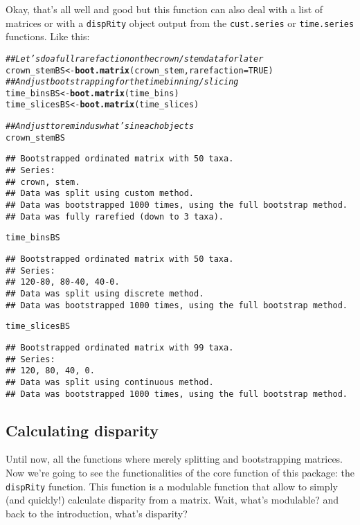 \documentclass{article}\usepackage[]{graphicx}\usepackage[]{color}
\makeatletter
\newcommand{\hlnum}[1]{\textcolor[rgb]{0.686,0.059,0.569}{#1}}%
\newcommand{\hlcom}[1]{\textcolor[rgb]{0.678,0.584,0.686}{\textit{#1}}}%
\newcommand{\hlstd}[1]{\textcolor[rgb]{0.345,0.345,0.345}{#1}}%
\newcommand{\hlkwb}[1]{\textcolor[rgb]{0.69,0.353,0.396}{#1}}%
\newcommand{\hlkwc}[1]{\textcolor[rgb]{0.333,0.667,0.333}{#1}}%
\newcommand{\hlkwd}[1]{\textcolor[rgb]{0.737,0.353,0.396}{\textbf{#1}}}%
\newenvironment{kframe}{%
 \def\at@end@of@kframe{}%
 \ifinner\ifhmode%
  \def\at@end@of@kframe{\end{minipage}}%
  \begin{minipage}{\columnwidth}%
 \fi\fi%
 \def\FrameCommand##1{\hskip\@totalleftmargin \hskip-\fboxsep
 \colorbox{shadecolor}{##1}\hskip-\fboxsep
     \hskip-\linewidth \hskip-\@totalleftmargin \hskip\columnwidth}%
 \MakeFramed {\advance\hsize-\width
   \@totalleftmargin\z@ \linewidth\hsize
   \@setminipage}}%
 {\par\unskip\endMakeFramed%
 \at@end@of@kframe}
\newenvironment{knitrout}{}{} %
\newcommand{\dispRity}{\texttt{dispRity} }
\makeatother
\begin{document}
Okay, that's all well and good but this function can also deal with a list of matrices or with a \dispRity object output from the \texttt{cust.series} or \texttt{time.series} functions.
Like this:

\begin{knitrout}
\color{fgcolor}\begin{kframe}
\begin{alltt}
\hlcom{## Let's do a full rarefaction on the crown/stem data for later}
\hlstd{crown_stemBS} \hlkwb{<-} \hlkwd{boot.matrix}\hlstd{(crown_stem,} \hlkwc{rarefaction} \hlstd{=} \hlnum{TRUE}\hlstd{)}
\hlcom{## And just bootstrapping for the time binning/slicing}
\hlstd{time_binsBS} \hlkwb{<-} \hlkwd{boot.matrix}\hlstd{(time_bins)}
\hlstd{time_slicesBS} \hlkwb{<-} \hlkwd{boot.matrix}\hlstd{(time_slices)}

\hlcom{## And just to remind us what's in each objects}
\hlstd{crown_stemBS}
\end{alltt}
\begin{verbatim}
## Bootstrapped ordinated matrix with 50 taxa. 
## Series:
## crown, stem.
## Data was split using custom method.
## Data was bootstrapped 1000 times, using the full bootstrap method.
## Data was fully rarefied (down to 3 taxa).
\end{verbatim}
\begin{alltt}
\hlstd{time_binsBS}
\end{alltt}
\begin{verbatim}
## Bootstrapped ordinated matrix with 50 taxa. 
## Series:
## 120-80, 80-40, 40-0.
## Data was split using discrete method.
## Data was bootstrapped 1000 times, using the full bootstrap method.
\end{verbatim}
\begin{alltt}
\hlstd{time_slicesBS}
\end{alltt}
\begin{verbatim}
## Bootstrapped ordinated matrix with 99 taxa. 
## Series:
## 120, 80, 40, 0.
## Data was split using continuous method.
## Data was bootstrapped 1000 times, using the full bootstrap method.
\end{verbatim}
\end{kframe}
\end{knitrout}

\subsection{Calculating disparity}
Until now, all the functions where merely splitting and bootstrapping matrices.
Now we're going to see the functionalities of the core function of this package: the \dispRity function.
This function is a modulable function that allow to simply (and quickly!) calculate disparity from a matrix.
Wait, what's modulable? and back to the introduction, what's disparity?
\end{document}
